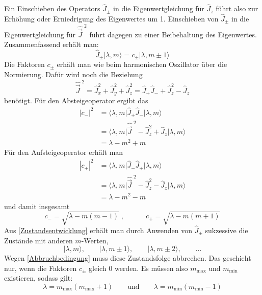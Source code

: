 \documentclass[9pt]{report}
\begin{document}
Ein Einschieben des Operators $\hat{J}_{\pm}$ in die Eigenwertgleichung für $\hat{J}_{z}$ führt also zur Erhöhung oder Erniedrigung des Eigenwertes um 1. Einschieben von $\hat{J}_{\pm}$ in die Eigenwertgleichung für $\hat{\vec{J}}^{\;2}$ führt dagegen zu einer Beibehaltung des Eigenwertes. Zusammenfassend erhält man:
\begin{equation}
\hat{J}_{\pm}\big|\lambda,m\big\rangle = c_{\pm}\big|\lambda,m\pm 1\big\rangle\label{Zustandsentwicklung}
\end{equation}
Die Faktoren $c_{\pm}$ erhält man wie beim harmonischen Oszillator über die Normierung. Dafür wird noch die Beziehung
\begin{equation}
\hat{\vec{J}}^{\;2}=\hat{J}_{x}^{2}+\hat{J}_{y}^{2}+\hat{J}_{z}^{2}=\hat{J}_{+}\hat{J}_{-}+\hat{J}_{z}^{2}-\hat{J}_{z}
\end{equation}
benötigt. Für den Absteigeoperator ergibt das
\begin{align}
|c_{-}|^{2} &= \big\langle\lambda,m\big|\hat{J}_{+}\hat{J}_{-}\big|\lambda,m\big\rangle\\
&= \big\langle\lambda,m\big|\hat{\vec{J}}^{\;2}-\hat{J}_{z}^{2}+\hat{J}_{z}\big|\lambda,m\big\rangle\\
&= \lambda-m^{2}+m
\end{align}
Für den Aufsteigeoperator erhält man
\begin{align}
|c_{+}|^{2} &= \big\langle\lambda,m\big|\hat{J}_{-}\hat{J}_{+}\big|\lambda,m\big\rangle\\
&= \big\langle\lambda,m\big|\hat{\vec{J}}^{\;2}-\hat{J}_{z}^{2}-\hat{J}_{z}\big|\lambda,m\big\rangle\\
&= \lambda-m^{2}-m
\end{align}
und damit insgesamt
\begin{equation}
c_{-}=\sqrt{\lambda-m(m-1)}\;,\qquad\quad c_{+}=\sqrt{\lambda-m(m+1)}
\end{equation}
Aus \eqref{Zustandsentwicklung} erhält man durch Anwenden von $\hat{J}_{\pm}$ sukzessive die Zustände mit anderen $m$-Werten,
\begin{equation}
|\lambda,m\rangle,\qquad|\lambda,m\pm 1\rangle,\qquad|\lambda,m\pm 2\rangle,\qquad ...\label{Zustandsfolge}
\end{equation}
Wegen \eqref{Abbruchbedingung} muss diese Zustandsfolge abbrechen. Das geschieht nur, wenn die Faktoren $c_{\pm}$ gleich 0 werden. Es müssen also $m_{\mathrm{max}}$ und $m_{\mathrm{min}}$ existieren, sodass gilt:
\begin{equation}
\lambda=m_{\mathrm{max}}(m_{\mathrm{max}}+1)\qquad\mathrm{und}\qquad\lambda=m_{\mathrm{min}}(m_{\mathrm{min}}-1)\label{m-Werte}
\end{equation}
\end{document}
